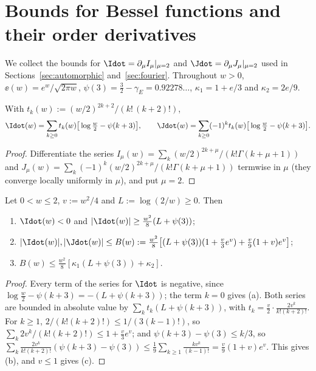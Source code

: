 \section{Bounds for Bessel functions and their order derivatives}\label{app:bessel}

We collect the bounds for $\Idot=\partial_\mu I_\mu|_{\mu=2}$ and $\Jdot=\partial_\mu J_\mu|_{\mu=2}$ used in Sections~\ref{sec:automorphic}
and~\ref{sec:fourier}. Throughout $w>0$, $\ee(w)=e^w/\sqrt{2\pi w}$, $\psi(3)=\frac32-\gamma_E=0.92278\ldots$, $\kappa_1=1+e/3$ and $\kappa_2=2e/9$.

\begin{lemma}\label{lem:dot-series}
With $t_k(w):=(w/2)^{2k+2}/(k!\,(k+2)!)$,
\[
\Idot(w)=\sum_{k\ge0}t_k(w)\big[\log\tfrac w2-\psi(k+3)\big],\qquad \Jdot(w)=\sum_{k\ge0}(-1)^kt_k(w)\big[\log\tfrac w2-\psi(k+3)\big].
\]
\end{lemma}

\begin{proof}
Differentiate the series $I_\mu(w)=\sum_k(w/2)^{2k+\mu}/(k!\Gamma(k+\mu+1))$ and $J_\mu(w)=\sum_k(-1)^k(w/2)^{2k+\mu}/(k!\Gamma(k+\mu+1))$
\cite[10.25.2, 10.2.2]{DLMF} termwise in $\mu$ (they converge locally uniformly in $\mu$), and put $\mu=2$.
\end{proof}

\begin{lemma}\label{lem:small-w}
Let $0<w\le2$, $v:=w^2/4$ and $L:=\log(2/w)\ge0$. Then
\begin{enumerate}[label=\textup{(\alph*)}]
\item $\Idot(w)<0$ and $|\Idot(w)|\ge\frac{w^2}8(L+\psi(3))$;
\item $|\Idot(w)|,|\Jdot(w)|\le B(w):=\frac{w^2}8\big[(L+\psi(3))(1+\frac v3e^v)+\frac v9(1+v)e^v\big]$;
\item $B(w)\le\frac{w^2}8[\kappa_1(L+\psi(3))+\kappa_2]$.
\end{enumerate}
\end{lemma}

\begin{proof}
Every term of the series for $\Idot$ is negative, since $\log\frac w2-\psi(k+3)=-(L+\psi(k+3))$; the term $k=0$ gives (a). Both series are bounded
in absolute value by $\sum_kt_k(L+\psi(k+3))$, with $t_k=\frac v2\cdot\frac{2v^k}{k!(k+2)!}$. For $k\ge1$, $2/(k!(k+2)!)\le1/(3(k-1)!)$, so
$\sum_k2v^k/(k!(k+2)!)\le1+\frac v3e^v$; and $\psi(k+3)-\psi(3)\le k/3$, so $\sum_k\frac{2v^k}{k!(k+2)!}(\psi(k+3)-\psi(3))\le\frac19\sum_{k\ge1}\frac{kv^k}{(k-1)!}=\frac v9(1+v)e^v$.
This gives (b), and $v\le1$ gives (c).
\end{proof}

